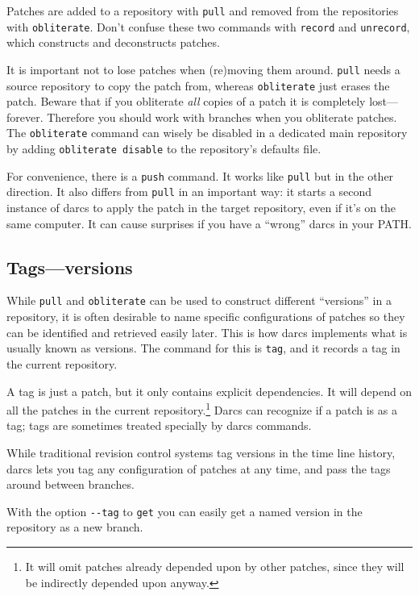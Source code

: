 Patches are added to a repository with \verb|pull|
and removed from the repositories with \verb|obliterate|.
Don't confuse these two commands with \verb|record| and \verb|unrecord|,
which constructs and deconstructs patches.

It is important not to lose patches when (re)moving them around.
\verb|pull| needs a source repository to copy the patch from,
whereas \verb|obliterate| just erases the patch.
Beware that if you obliterate \emph{all} copies of a patch
it is completely lost---forever.
Therefore you should work with branches when you obliterate patches.
The \verb|obliterate| command can wisely be disabled in a dedicated main repository
by adding \verb|obliterate disable| to the repository's defaults file.

For convenience, there is a \verb|push| command.
It works like \verb|pull| but in the other direction.
It also differs from \verb|pull| in an important way:
it starts a second instance of darcs to apply the patch in the target repository,
even if it's on the same computer.
It can cause surprises if you have a ``wrong'' darcs in your PATH.


\subsection{Tags---versions}

While \verb|pull| and \verb|obliterate| can be used to
construct different ``versions'' in a repository,
it is often desirable to name specific configurations of patches
so they can be identified and retrieved easily later.
This is how darcs implements what is usually known as versions.
The command for this is \verb|tag|,
and it records a tag in the current repository.

A tag is just a patch, but it only contains explicit dependencies.
It will depend on all the patches in the current repository.\footnote{%
It will omit patches already depended upon by other patches,
since they will be indirectly depended upon anyway.}
Darcs can recognize if a patch is as a tag;
tags are sometimes treated specially by darcs commands.

While traditional revision control systems tag versions in the time line history,
darcs lets you tag any configuration of patches at any time,
and pass the tags around between branches.

With the option \verb|--tag| to \verb|get| you can easily get
a named version in the repository
as a new branch.


